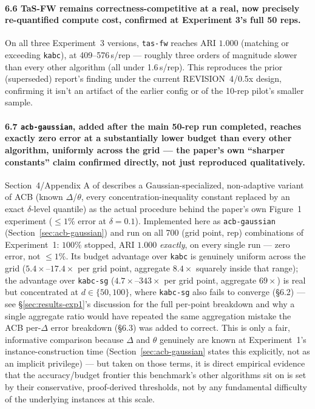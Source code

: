 \documentclass[11pt]{article}
\begin{document}
\paragraph{6.6 TaS-FW remains correctness-competitive at a real, now
precisely re-quantified compute cost, confirmed at Experiment 3's full 50
reps.} On all three Experiment~3 versions, \texttt{tas-fw} reaches ARI
$1.000$ (matching or exceeding \texttt{kabc}), at 409--576\,s/rep ---
roughly three orders of magnitude slower than every other algorithm (all
under 1.6\,s/rep). This reproduces the prior (superseded) report's finding
under the current REVISION~4/0.5x design, confirming it isn't an artifact
of the earlier config or of the 10-rep pilot's smaller sample.

\paragraph{6.7 \texttt{acb-gaussian}, added after the main 50-rep run
completed, reaches exactly zero error at a substantially lower budget than
every other algorithm, uniformly across the grid --- the paper's own
``sharper constants'' claim confirmed directly, not just reproduced
qualitatively.} Section~4/Appendix A of \cite{acb2024} describes a
Gaussian-specialized, non-adaptive variant of ACB (known $\Delta$/$\theta$,
every concentration-inequality constant replaced by an exact
$\delta$-level quantile) as the actual procedure behind the paper's own
Figure~1 experiment ($\le 1\%$ error at $\delta=0.1$). Implemented here as
\texttt{acb-gaussian} (Section~\ref{sec:acb-gaussian}) and run on all 700
(grid point, rep) combinations of Experiment~1: $100\%$ stopped, ARI
$1.000$ \emph{exactly}, on every single run --- zero error, not $\le 1\%$.
Its budget advantage over \texttt{kabc} is genuinely uniform across the
grid ($5.4\times$--$17.4\times$ per grid point, aggregate $8.4\times$
squarely inside that range); the advantage over \texttt{kabc-sg}
($4.7\times$--$343\times$ per grid point, aggregate $69\times$) is real
but concentrated at $d\in\{50,100\}$, where \texttt{kabc-sg} also fails to
converge (\S6.2) --- see \S\ref{sec:results-exp1}'s discussion for the
full per-point breakdown and why a single aggregate ratio would have
repeated the same aggregation mistake the ACB per-$\Delta$ error breakdown
(\S6.3) was added to correct. This is only a fair, informative comparison
because $\Delta$ and $\theta$ genuinely are known at Experiment~1's
instance-construction time (Section~\ref{sec:acb-gaussian} states this
explicitly, not as an implicit privilege) --- but taken on those terms, it
is direct empirical evidence that the accuracy/budget frontier this
benchmark's other algorithms sit on is set by their conservative,
proof-derived thresholds, not by any fundamental difficulty of the
underlying instances at this scale.
\end{document}

